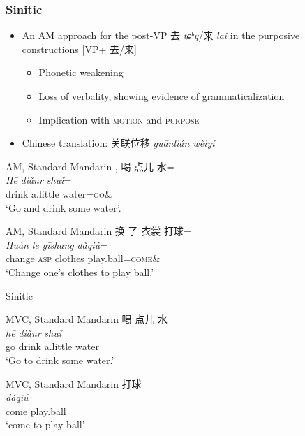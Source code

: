 \documentclass[xcolor=table]{beamer}
\newcommand{\bleu}[1]{{\color{blue}#1}}
\newcommand{\rouge}[1]{{\color{red}#1}}
\newcommand{\ipa}[1]{{\phon\textit{#1}}}
\newcommand{\zh}[1]{{\cn #1}}
\newcommand{\sens}[1]{‘#1’}
\begin{document}
 \begin{frame} 
\frametitle{Sinitic}
\begin{itemize}
\item An AM approach for the post-VP \zh{去 \ipa{tɕʰy}}/\zh{来 \ipa{lai}} in the purposive constructions [VP+ \zh{去/来}] 
\begin{itemize}
\item Phonetic weakening
\item Loss of verbality, showing evidence of grammaticalization
\item Implication with \textsc{motion} and \textsc{purpose}
\end{itemize}
\item Chinese translation: \zh{关联位移} \ipa{guānlián wèiyí}
\end{itemize}

\begin{exe}
\ex AM, Standard Mandarin \citep{lu1985vpqu},  \citep{lamarre17deictic} \label{distribution2}
\glll
\zh{喝} \zh{点儿} \zh{水}=\rouge{\zh{去}} \\
\ipa{Hē} \ipa{diǎnr} \ipa{shuǐ}=\rouge{\ipa{qu}} \\
drink  a.little water=\textsc{go}$\&$ \\
\glt \sens{Go and drink some water}.
\end{exe}

\begin{exe}
\ex AM, Standard Mandarin \citep[479]{chao68chinese} 
\glll
\zh{换} \zh{了} \zh{衣裳}  \zh{打球}=\rouge{\zh{来}} \\
\ipa{Huàn} \ipa{le} \ipa{yīshang} \ipa{dǎqi\'{u}}=\rouge{\ipa{lai}}  \\
change \textsc{asp} clothes play.ball=\textsc{come}$\&$ \\
\glt \sens{Change one's clothes to play ball.}
\end{exe}

\end{frame}

\begin{frame}{Sinitic}


\begin{exe}
\ex MVC, Standard Mandarin \citep{lu1985vpqu} \label{inventory2}
\glll
\bleu{\zh{去}} \zh{喝} \zh{点儿} \zh{水} \\
\bleu{\ipa{Qù}} \ipa{hē} \ipa{diǎnr} \ipa{shuǐ} \\
go drink a.little water \\
\glt \sens{Go to drink some water.}
\end{exe}

\begin{exe}
\ex MVC, Standard Mandarin \citep[479]{chao68chinese} 
\glll
 \bleu{\zh{来}} \zh{打球}  \\
\bleu{\ipa{Lái}} \ipa{dǎqi\'{u}}   \\
come play.ball \\
 \glt \sens{come to play ball}
\end{exe}

\end{frame}
\end{document}
